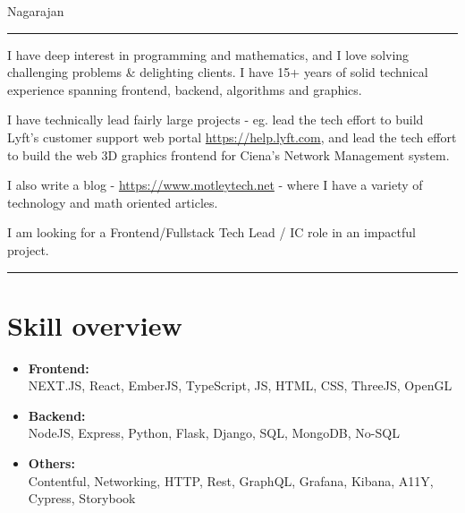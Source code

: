 \documentclass[line, 11pt]{res}
\renewenvironment{resume}{\begingroup}{\endgroup}
\begin{document}
{\huge Nagarajan} %


\begin{resume}

\vspace{5pt}
\hrule
\vspace{-5pt}
I have deep interest in programming and mathematics, and I love solving challenging problems \& delighting clients.  I have 15+ years of solid technical experience spanning frontend, backend, algorithms and graphics.

I have technically lead fairly large projects - eg. lead the tech effort to build Lyft's customer support web portal \href{https://help.lyft.com}{https://help.lyft.com}, and lead the tech effort to build the web 3D graphics frontend for Ciena's Network Management system.

I also write a blog - \href{https://www.motleytech.net}{https://www.motleytech.net} - where I have a variety of technology and math oriented articles.

I am looking for a Frontend/Fullstack Tech Lead / IC role in an impactful project.

\vspace{8pt}
\hrule

\vspace{-7pt}
\section{Skill overview}
    \begin{itemize}
        \item \textbf{Frontend: } \\
        NEXT{\tiny.JS}, React, EmberJS, TypeScript, JS, HTML, CSS, ThreeJS, OpenGL
        \item \textbf{Backend: } \\
        NodeJS, Express, Python, Flask, Django, SQL, MongoDB, No-SQL
        \item \textbf{Others: } \\
        Contentful, Networking, HTTP, Rest, GraphQL, Grafana, Kibana, A11Y, Cypress, Storybook
    \end{itemize}


\end{resume}
\end{document}
